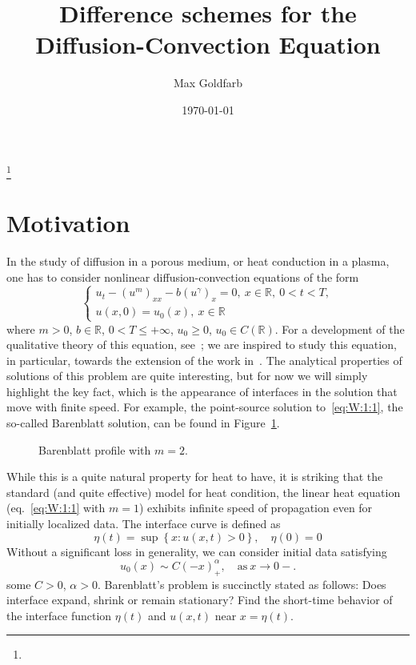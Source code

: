 \documentclass[12pt, reqno]{amsart}
\newcommand{\bk}[1]{\left\{#1\right\}}
\newcommand{\field}[1]{\mathbb{#1}}
\newcommand{\R}{\field{R}}
\begin{document}
\title{Difference schemes for the Diffusion-Convection Equation}
\author{Max Goldfarb}
\thanks{}
\address{Mathematical Sciences Department\\Florida Institute of Technology\\150 W.\ University Blvd.\\Melbourne, FL 32901}
\date{\today}
\maketitle
\section{Motivation}
In the study of diffusion in a porous medium, or heat conduction in a plasma, one has to consider nonlinear diffusion-convection equations of the form
\begin{equation}
\begin{cases}
u_t-(u^m)_{xx}-b(u^{\gamma})_x=0,~ x \in \R,~ 0<t<T,\\
u(x,0)=u_0(x),~  x \in \R
\end{cases}\label{eq:W:1:1}
\end{equation}
where $m>0$, $b\in \R$, $0< T \leq +\infty$, $u_0\geq 0$, $u_0 \in C(\R)$.
For a development of the qualitative theory of this equation, see~\cite{vazquez07}; we are inspired to study this equation, in particular, towards the extension of the work in~\cite{abdulla00a,abdulla02,abdulla00}.
The analytical properties of solutions of this problem are quite interesting, but for now we will simply highlight the key fact, which is the appearance of interfaces in the solution that move with finite speed.
For example, the point-source solution to~\eqref{eq:W:1:1}, the so-called Barenblatt solution, can be found in Figure~\ref{fig:barenblatt-profile}.
%
\begin{figure}[ht]
\def\datafiledir{images}
\caption{Barenblatt profile with \(m=2\).}\label{fig:barenblatt-profile}
\end{figure}
%
While this is a quite natural property for heat to have, it is striking that the standard (and quite effective) model for heat condition, the linear heat equation (eq.~\eqref{eq:W:1:1} with \(m=1\)) exhibits infinite speed of propagation even for initially localized data.
The interface curve is defined as
\begin{equation}
\eta(t)=\sup\bk{x: u(x,t)>0 },\quad \eta(0)=0
\end{equation}%
Without a significant loss in generality, we can consider initial data satisfying
\begin{equation}
u_0(x) \sim  C(-x)_+^\alpha,\quad\text{as}~ x\rightarrow 0-.\label{eq:W:1:3}
\end{equation}
some $C>0$, $\alpha>0$.
Barenblatt's problem is succinctly stated as follows: Does interface expand, shrink or remain stationary?
Find the short-time behavior of the interface function $\eta(t)$ and $u(x,t)$ near $x=\eta(t)$.
\end{document}
